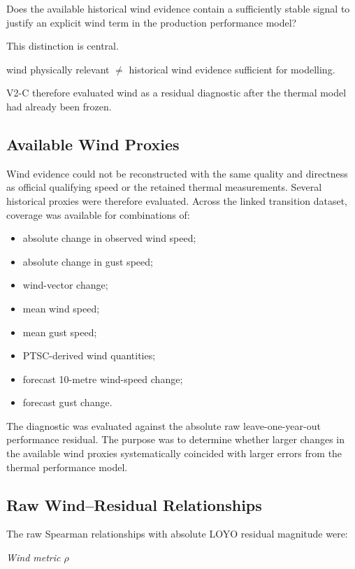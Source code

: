 Does the available historical wind evidence contain a sufficiently stable signal to justify an explicit wind term in the production performance model?

This distinction is central.

wind physically relevant \ensuremath{\neq} historical wind evidence sufficient for modelling.

V2-C therefore evaluated wind as a residual diagnostic after the thermal model had already been frozen.

\subsection{Available Wind Proxies}
Wind evidence could not be reconstructed with the same quality and directness as official qualifying speed or the retained thermal measurements. Several historical proxies were therefore evaluated. Across the linked transition dataset, coverage was available for combinations of:

\begin{itemize}
\item absolute change in observed wind speed;
\item absolute change in gust speed;
\item wind-vector change;
\item mean wind speed;
\item mean gust speed;
\item PTSC-derived wind quantities;
\item forecast 10-metre wind-speed change;
\item forecast gust change.
\end{itemize}

The diagnostic was evaluated against the absolute raw leave-one-year-out performance residual. The purpose was to determine whether larger changes in the available wind proxies systematically coincided with larger errors from the thermal performance model.

\subsection{Raw Wind--Residual Relationships}
The raw Spearman relationships with absolute LOYO residual magnitude were:

\begin{center}\textit{Wind metric                     \ensuremath{\rho}}\end{center}

